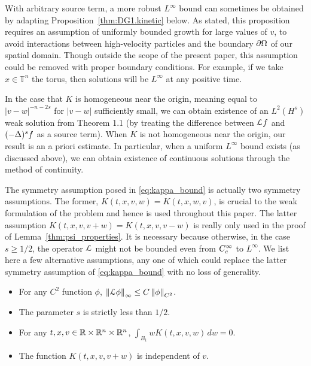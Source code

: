 With arbitrary source term, a more robust $L^\infty$ bound can sometimes be obtained by adapting Proposition~\ref{thm:DG1.kinetic} below.  As stated, this proposition requires an assumption of uniformly bounded growth for large values of $v$, to avoid interactions between high-velocity particles and the boundary $\partial \Omega$ of our spatial domain.  Though outside the scope of the present paper, this assumption could be removed with proper boundary conditions.  For example, if we take $x \in \mathbb{T}^n$ the torus, then solutions will be $L^\infty$ at any positive time.  

In the case that $K$ is homogeneous near the origin, meaning equal to $|v-w|^{-n-2s}$ for $|v-w|$ sufficiently small, we can obtain existence of an $L^2(H^s)$ weak solution from \cite{MoXu} Theorem 1.1 (by treating the difference between $\mathcal{L} f$ and $(-\Delta)^sf$ as a source term).  When $K$ is not homogeneous near the origin, our result is an a priori estimate.  In particular, when a uniform $L^\infty$ bound exists (as discussed above), we can obtain existence of continuous solutions through the method of continuity.  


The symmetry assumption posed in \eqref{eq:kappa_bound} is actually two symmetry assumptions.  The former, $K(t,x,v,w) = K(t,x,w,v)$, is crucial to the weak formulation of the problem and hence is used throughout this paper.  The latter assumption $K(t,x,v,v+w) = K(t,x,v,v-w)$ is really only used in the proof of Lemma~\ref{thm:psi_properties}.  It is necessary because otherwise, in the case $s \geq 1/2$, the operator $\mathcal{L}$ might not be bounded even from $C_c^\infty$ to $L^\infty$.  We list here a few alternative assumptions, any one of which could replace the latter symmetry assumption of \eqref{eq:kappa_bound} with no loss of generality.  
\begin{itemize}
\item For any $C^2$ function $\phi$, $\left\lVert\mathcal{L} \phi\right\rVert_\infty \leq C \left\lVert\phi\right\rVert_{C^2}$. 
\item The parameter $s$ is strictly less than $1/2$.  
\item For any $t,x,v \in \mathbb{R}\times\mathbb{R}^n\times\mathbb{R}^n$, $\int_{B_1} w K(t,x,v,w) \,dw = 0$.  
\item The function $K(t,x,v,v+w)$ is independent of $v$. 
\end{itemize}

